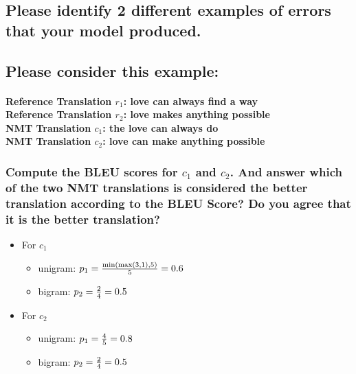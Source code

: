 \documentclass[12pt, letterpaper]{article}
\begin{document}
\subsection{Please identify 2 different examples of errors that your model produced.}

\subsection{Please consider this example:}

\paragraph{Reference Translation $r_1$: love can always find a way \\
Reference Translation $r_2$: love makes anything possible \\
NMT Translation $c_1$: the love can always do \\
NMT Translation $c_2$: love can make anything possible}

\subsubsection{Compute the BLEU scores for $c_1$ and $c_2$. And answer which of the two NMT translations is considered the better translation according to the BLEU Score? Do you agree that it is the better translation?}

\begin{itemize}[topsep=0pt, partopsep=0pt]
  \item For $c_1$ {
    \begin{itemize}
      \item unigram: $p_1 = {\min(\max(3, 1), 5) \over 5} = 0.6$
      \item bigram: $p_2 = {2 \over 4} = 0.5$
    \end{itemize}
  }
  \item For $c_2$ {
    \begin{itemize}
      \item unigram: $p_1 = {4 \over 5} = 0.8$
      \item bigram: $p_2 = {2 \over 4} = 0.5$
    \end{itemize}
  }
\end{itemize}
\end{document}
